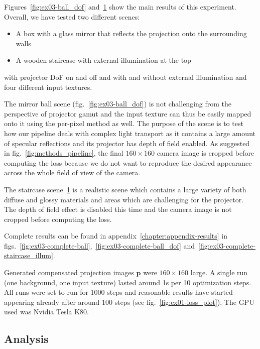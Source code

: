 \begin{figure}[]
    \label{fig:ex03-staircase_illum}
\end{figure}

Figures~\ref{fig:ex03-ball_dof} and~\ref{fig:ex03-staircase_illum} show the main results of this experiment. Overall, we have tested two different scenes:

\begin{itemize}
    \item A box with a glass mirror that reflects the projection onto the surrounding walls
    \item A wooden staircase with external illumination at the top
\end{itemize}

with projector DoF on and off and with and without external illumination and four different input textures.

The mirror ball scene (fig.~\ref{fig:ex03-ball_dof}) is not challenging from the perspective of projector gamut and the input texture can thus be easily mapped onto it using the per-pixel method as well. The purpose of the scene is to test how our pipeline deals with complex light transport as it contains a large amount of specular reflections and its projector has depth of field enabled. As suggested in fig.~\ref{fig:methods_pipeline}, the final \(160 \times 160\) camera image is cropped before computing the loss because we do not want to reproduce the desired appearance across the whole field of view of the camera.

The staircase scene~\ref{fig:ex03-staircase_illum} is a realistic scene which contains a large variety of both diffuse and glossy materials and areas which are challenging for the projector. The depth of field effect is disabled this time and the camera image is not cropped before computing the loss.

Complete results can be found in appendix~\ref{chapter:appendix-results} in figs.~\ref{fig:ex03-complete-ball},~\ref{fig:ex03-complete-ball_dof} and~\ref{fig:ex03-complete-staircase_illum}.

Generated compensated projection images \(\bm{p}\) were \(160 \times 160\) large. A single run (one background, one input texture) lasted around 1s per 10 optimization steps. All runs were set to run for 1000 steps and reasonable results have started appearing already after around 100 steps (see fig.~\ref{fig:ex01-loss_plot}). The GPU used was Nvidia Tesla K80.

\subsection{Analysis}
\label{section:results-experiments-03-analysis}

